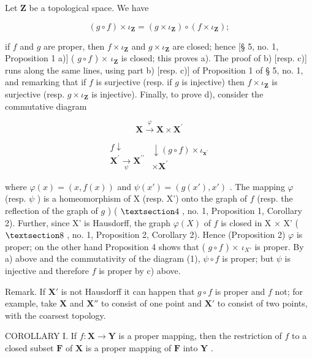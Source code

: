 Let \(\mathbf{Z}\) be a topological space. We have

\[
(g \circ f) \times \iota_ {\mathbf {Z}} = (g \times \iota_ {\mathbf {Z}}) \circ (f \times \iota_ {\mathbf {Z}});
\]

if \(f\) and \(g\) are proper, then \(f \times \iota_{\mathbf{Z}}\) and \(g \times \iota_{\mathbf{Z}}\) are closed; hence {[}§ 5, no. 1, Proposition 1 a){]} ( \(g \circ f\) ) × \(\iota_{\mathbf{Z}}\) is closed; this proves a). The proof of b) {[}resp. c){]} runs along the same lines, using part b) {[}resp. c){]} of Proposition 1 of § 5, no. 1, and remarking that if \(f\) is surjective (resp. if \(g\) is injective) then \(f \times \iota_{\mathbf{Z}}\) is surjective (resp. \(g \times \iota_{\mathbf{Z}}\) is injective). Finally, to prove d), consider the commutative diagram

\[
\mathbf {X} \stackrel {\varphi} {\rightarrow} \mathbf {X} \times \mathbf {X} ^ {\prime}\tag{1}
\]

\[
\begin{array}{c} f \downarrow \\ \mathbf {X} ^ {\prime} \xrightarrow [ \psi ]{} \mathbf {X} ^ {\prime \prime} \end{array} \begin{array}{c} \downarrow (g \circ f) \times \iota_ {\mathbf {x} ^ {\prime}} \\ \times \mathbf {X} ^ {\prime} \end{array}
\]

where \(\varphi(x) = (x, f(x))\) and \(\psi(x') = (g(x'), x')\) . The mapping \(\varphi\) (resp. \(\psi\) ) is a homeomorphism of X (resp. X') onto the graph of \(f\) (resp. the reflection of the graph of \(g\) ) ( \(\S 4\) , no. 1, Proposition 1, Corollary 2). Further, since X' is Hausdorff, the graph \(\varphi(X)\) of \(f\) is closed in X × X' ( \(\S 8\) , no. 1, Proposition 2, Corollary 2). Hence (Proposition 2) \(\varphi\) is proper; on the other hand Proposition 4 shows that ( \(g \circ f\) ) × \(\iota_{X'}\) is proper. By a) above and the commutativity of the diagram (1), \(\psi \circ f\) is proper; but \(\psi\) is injective and therefore \(f\) is proper by c) above.

Remark. If \(\mathbf{X}'\) is not Hausdorff it can happen that \(g \circ f\) is proper and \(f\) not; for example, take \(\mathbf{X}\) and \(\mathbf{X}''\) to consist of one point and \(\mathbf{X}'\) to consist of two points, with the coarsest topology.

COROLLARY I. If \(f: \mathbf{X} \to \mathbf{Y}\) is a proper mapping, then the restriction of \(f\) to a closed subset \(\mathbf{F}\) of \(\mathbf{X}\) is a proper mapping of \(\mathbf{F}\) into \(\mathbf{Y}\) .

